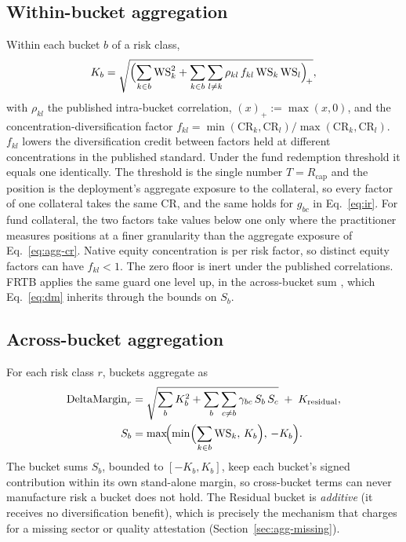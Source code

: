 \subsection{Within-bucket aggregation}\label{sec:agg-bucket}
Within each bucket $b$ of a risk class,
\begin{equation}\label{eq:kb}
K_b=\sqrt{\Bigl(\sum_{k\in b}\mathrm{WS}_k^2+\sum_{k\in b}\sum_{l\neq k}\rho_{kl}\,f_{kl}\,
\mathrm{WS}_k\,\mathrm{WS}_l\Bigr)_{\!+}},
\end{equation}
with $\rho_{kl}$ the published intra-bucket correlation, $(x)_+:=\max(x,0)$, and the
concentration-diversification factor
$f_{kl}=\min(\mathrm{CR}_k,\mathrm{CR}_l)/\max(\mathrm{CR}_k,\mathrm{CR}_l)$.
$f_{kl}$ lowers the diversification credit between factors held at different
concentrations in the published standard. Under the fund redemption threshold it equals one
identically. The threshold is the single number $T=R_{\mathrm{cap}}$ and the position is
the deployment's aggregate exposure to the collateral, so every factor of one collateral
takes the same $\mathrm{CR}$, and the same holds for $g_{bc}$ in
Eq.~\eqref{eq:ir}. For fund collateral, the two factors take
values below one only where the practitioner measures positions at a finer granularity
than the aggregate exposure of Eq.~\eqref{eq:agg-cr}. Native equity concentration is per risk factor, so distinct equity factors can have $f_{kl}<1$. The zero floor is inert under the published
correlations. FRTB applies the
same guard one level up, in the across-bucket sum \citep{bcbs_frtb_d457}, which
Eq.~\eqref{eq:dm} inherits through the bounds on $S_b$.

\subsection{Across-bucket aggregation}\label{sec:agg-class}
For each risk class $r$, buckets aggregate as
\begin{equation}\label{eq:dm}
\begin{aligned}
\mathrm{DeltaMargin}_r&=\sqrt{\sum_b K_b^2+\sum_b\sum_{c\neq b}\gamma_{bc}\,S_b\,S_c}
\;+\;K_{\mathrm{residual}},\\
S_b&=\max\!\Bigl(\min\Bigl(\sum_{k\in b}\mathrm{WS}_k,\,K_b\Bigr),\,-K_b\Bigr).
\end{aligned}
\end{equation}
The bucket sums $S_b$, bounded to $[-K_b,K_b]$, keep each bucket's signed contribution
within its own stand-alone margin, so cross-bucket terms can never manufacture risk a
bucket does not hold. The
Residual bucket is \emph{additive} (it receives no diversification benefit), which
is precisely the mechanism that charges for a missing sector or quality attestation
(Section~\ref{sec:agg-missing}).

